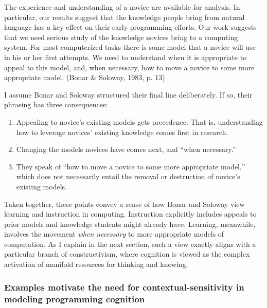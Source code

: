 The experience and understanding of a novice are available for analysis.
In particular, our results suggest that the knowledge people bring from
natural language has a key effect on their early programming efforts.
Our work suggests that we need serious study of the knowledge novices
bring to a computing system. For most computerized tasks there is some
model that a novice will use in his or her first attempts. We need to
understand when it is appropriate to appeal to this model, and, when
necessary, how to move a novice to some more appropriate model. (Bonar
\& Soloway, 1983, p. 13)

I assume Bonar and Soloway structured their final line deliberately. If
so, their phrasing has three consequences:

\begin{enumerate}
\def\labelenumi{\arabic{enumi}.}
\item
  Appealing to novice's existing models gets precedence. That is,
  understanding how to leverage novices' existing knowledge comes first
  in research.
\item
  Changing the models novices have comes next, and ``when necessary.''
\item
  They speak of ``how to move a novice to some more appropriate model,''
  which does not necessarily entail the removal or destruction of
  novice's existing models.
\end{enumerate}

Taken together, these points convey a sense of how Bonar and Soloway
view learning and instruction in computing. Instruction explicitly
includes appeals to prior models and knowledge students might already
have. Learning, meanwhile, involves the movement \emph{when necessary}
to more appropriate models of computation. As I explain in the next
section, such a view exactly aligns with a particular branch of
constructivism, where cognition is viewed as the complex activation of
manifold resources for thinking and knowing.

\subsubsection{Examples motivate the need for contextual-sensitivity in
modeling programming
cognition}\label{examples-motivate-the-need-for-contextual-sensitivity-in-modeling-programming-cognition}

